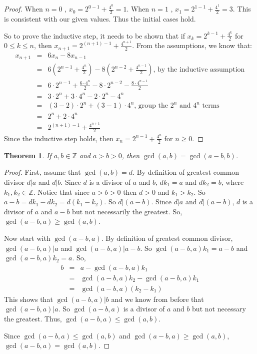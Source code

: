 \documentclass{article}
\newtheorem{theorem}{Theorem}
\begin{document}
\begin{proof}
    When $n=0$ , $x_0 = 2^{0-1}+\frac{4^0}{2} = 1$.
    When $n=1$ , $x_1 = 2^{1-1}+\frac{4^1}{2} = 3$. This is consistent with our given values. Thus the initial cases hold.
    
    So to prove the inductive step, it needs to be shown that if $x_k = 2^{k-1} + \frac{4^k}{2}$ for $0\leq k \leq n$, then $x_{n+1} = 2^{(n+1)-1} + \frac{4^{n+1}}{2}$. From the assumptions, we know that:
    \begin{eqnarray*}
        x_{n+1} &=& 6 x_{n} - 8 x_{n-1}\\
        &=& 6\left(2^{n-1} + \frac{4^n}{2}\right) - 8\left(2^{n-2} + \frac{4^{n-1}}{2}\right) \text{, by the inductive assumption}\\
         &=& 6\cdot2^{n-1} + \frac{6\cdot 4^n}{2} - 8\cdot 2^{n-2} - \frac{8 \cdot 4^{n-1}}{2} \\
         &=& 3\cdot2^{n} + 3\cdot 4^n - 2\cdot 2^{n} -  4^{n} \\
         &=& (3-2)\cdot2^{n} +(3-1) \cdot 4^n\text{, group the $2^n$ and $4^n$ terms}\\
         &=& 2^{n} + 2\cdot 4^{n} \\
         &=& 2^{(n+1)-1} + \frac{4^{n+1}}{2}
    \end{eqnarray*}
    Since the inductive step holds, then $x_n=2^{n-1}+\frac{4^n}{2}$ for $n\geq 0$.
\end{proof}

\pagebreak
\begin{theorem}
    If $a,b \in \mathbb{Z}$ and $a>b>0$, then $\gcd(a,b) = \gcd(a-b,b)$.    
\end{theorem}

\begin{proof}
    First, assume that $\gcd(a,b) = d$. By definition of greatest common divisor $d|a$ and $d|b$. Since $d$ is a divisor of $a$ and $b$, $dk_1 =a$ and $dk_2 = b$, where $k_1,k_2\in \mathbb{Z}$. Notice that since $a>b>0$ then $d>0$ and $k_1>k_2$.  So $a-b = dk_1 - dk_2 = d(k_1-k_2)$. So $d|(a-b)$. Since $d|a$ and $d|(a-b)$, $d$ is a divisor of $a$ and $a-b$ but not necessarily the greatest. So, $\gcd(a-b,a)\geq \gcd(a,b)$. 
    
    Now start with $\gcd(a-b,a)$. By definition of greatest common divisor, $\gcd(a-b,a)|a$ and $\gcd(a-b,a)|a-b$. So $\gcd(a-b,a)k_1=a-b$ and $\gcd(a-b,a)k_2 = a$. So,
    \begin{eqnarray*}
        b &=& a-\gcd(a-b,a)k_1\\
        &=& \gcd(a-b,a)k_2-\gcd(a-b,a)k_1\\
        &=&\gcd(a-b,a)(k_2-k_1)
    \end{eqnarray*}    
    This shows that $\gcd(a-b,a)|b$ and we know from before that $\gcd(a-b,a)|a$. So $\gcd(a-b,a)$ is a divisor of $a$ and $b$ but not necessary the greatest. Thus, $\gcd(a-b,a)\leq \gcd(a,b)$.
    
    Since $\gcd(a-b,a)\leq \gcd(a,b)$ and $\gcd(a-b,a)\geq \gcd(a,b)$, $\gcd(a-b,a)= \gcd(a,b)$.
\end{proof}
\end{document}

